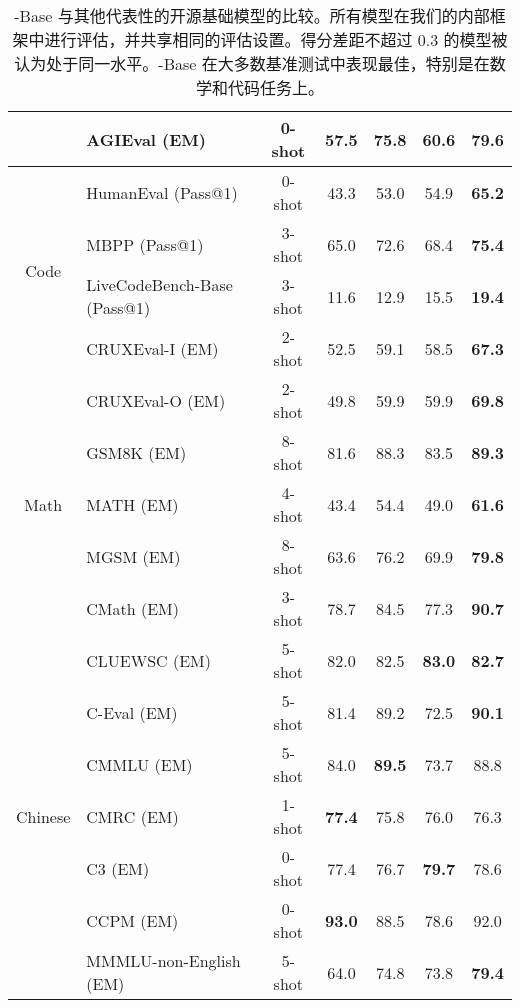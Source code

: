 \begin{table}[!h]
\begin{tabular}{@{}c l c | c | c c | c@{}}
    & AGIEval {\tiny (EM)} & 0-shot & 57.5 & 75.8 & 60.6 & \textbf{79.6} \\
    \midrule
    \multirow{4}{*}{Code} & HumanEval {\tiny (Pass@1)} & 0-shot & 43.3 & 53.0 & 54.9 & \textbf{65.2} \\
    & MBPP {\tiny (Pass@1)} & 3-shot & 65.0 & 72.6 & 68.4 & \textbf{75.4} \\
    & LiveCodeBench-Base {\tiny (Pass@1)} & 3-shot & 11.6 & 12.9 & 15.5 & \textbf{19.4} \\
    & CRUXEval-I {\tiny (EM)} & 2-shot & 52.5 & 59.1 & 58.5 & \textbf{67.3} \\
    & CRUXEval-O {\tiny (EM)} & 2-shot & 49.8 & 59.9 & 59.9 & \textbf{69.8} \\
    \midrule
    \multirow{3}{*}{Math} & GSM8K {\tiny (EM)} & 8-shot & 81.6 & 88.3 & 83.5 & \textbf{89.3} \\
    & MATH {\tiny (EM)} & 4-shot & 43.4 & 54.4 & 49.0 & \textbf{61.6} \\
    & MGSM {\tiny (EM)} & 8-shot & 63.6 & 76.2 & 69.9 & \textbf{79.8} \\
    & CMath {\tiny (EM)} & 3-shot & 78.7 & 84.5 & 77.3 & \textbf{90.7} \\
    \midrule
    \multirow{7}{*}{Chinese} & CLUEWSC {\tiny (EM)} & 5-shot & 82.0 & 82.5 & \textbf{83.0} & \textbf{82.7} \\
    & C-Eval {\tiny (EM)} & 5-shot & 81.4 & 89.2 & 72.5 & \textbf{90.1} \\
    & CMMLU {\tiny (EM)} & 5-shot & 84.0 & \textbf{89.5} & 73.7 & 88.8 \\
    & CMRC {\tiny (EM)} & 1-shot & \textbf{77.4} & 75.8 & 76.0 & 76.3 \\
    & C3 {\tiny (EM)} & 0-shot & 77.4 & 76.7 & \textbf{79.7} & 78.6 \\
    & CCPM {\tiny (EM)} & 0-shot & \textbf{93.0} & 88.5 & 78.6 & 92.0 \\
    \midrule
    \multirow{1}{*}{Multilingual} & MMMLU-non-English {\tiny (EM)} & 5-shot & 64.0 & 74.8 & 73.8 & \textbf{79.4} \\
    \bottomrule
    \end{tabular}
    \caption{\dsviii{}-Base 与其他代表性的开源基础模型的比较。所有模型在我们的内部框架中进行评估，并共享相同的评估设置。得分差距不超过 0.3 的模型被认为处于同一水平。\dsviii{}-Base 在大多数基准测试中表现最佳，特别是在数学和代码任务上。}
    \label{tab:main}
\end{table}